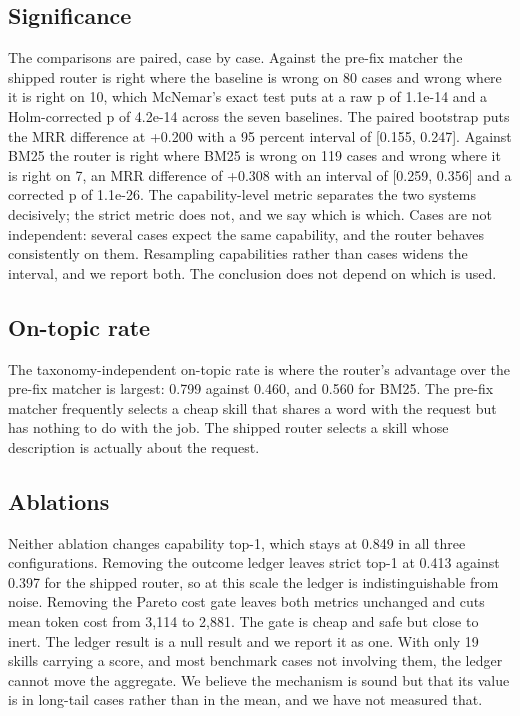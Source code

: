 \documentclass[sigconf,acmsmall]{acmart}
\begin{document}
\subsection{Significance}
The comparisons are paired, case by case. Against the pre-fix matcher the shipped router is right where the baseline is wrong on 80 cases and wrong where it is right on 10, which McNemar's exact test puts at a raw p of 1.1e-14 and a Holm-corrected p of 4.2e-14 across the seven baselines. The paired bootstrap puts the MRR difference at +0.200 with a 95 percent interval of [0.155, 0.247].
Against BM25 the router is right where BM25 is wrong on 119 cases and wrong where it is right on 7, an MRR difference of +0.308 with an interval of [0.259, 0.356] and a corrected p of 1.1e-26. The capability-level metric separates the two systems decisively; the strict metric does not, and we say which is which.
Cases are not independent: several cases expect the same capability, and the router behaves consistently on them. Resampling capabilities rather than cases widens the interval, and we report both. The conclusion does not depend on which is used.

\subsection{On-topic rate}
The taxonomy-independent on-topic rate is where the router's advantage over the pre-fix matcher is largest: 0.799 against 0.460, and 0.560 for BM25. The pre-fix matcher frequently selects a cheap skill that shares a word with the request but has nothing to do with the job. The shipped router selects a skill whose description is actually about the request.

\subsection{Ablations}
Neither ablation changes capability top-1, which stays at 0.849 in all three configurations. Removing the outcome ledger leaves strict top-1 at 0.413 against 0.397 for the shipped router, so at this scale the ledger is indistinguishable from noise. Removing the Pareto cost gate leaves both metrics unchanged and cuts mean token cost from 3,114 to 2,881. The gate is cheap and safe but close to inert.
The ledger result is a null result and we report it as one. With only 19 skills carrying a score, and most benchmark cases not involving them, the ledger cannot move the aggregate. We believe the mechanism is sound but that its value is in long-tail cases rather than in the mean, and we have not measured that.
\end{document}
